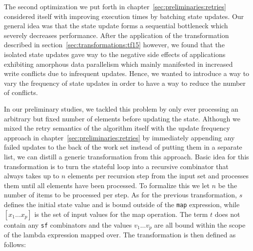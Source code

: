 The second optimization we put forth in chapter~\ref{sec:preliminaries:retries} considered itself with improving execution times by batching state updates.
Our general idea was that the state update forms a sequential bottleneck which severely decreases performance.
After the application of the transformation described in section~\ref{sec:transformations:tf15} however, we found that the isolated state updates gave way to the negative side effects of applications exhibiting amorphous data parallelism which mainly manifested in increased write conflicts due to infrequent updates.
Hence, we wanted to introduce a way to vary the frequency of state updates in order to have a way to reduce the number of conflicts.

In our preliminary studies, we tackled this problem by only ever processing an arbitrary but fixed number of elements before updating the state.
Although we mixed the retry semantics of the algorithm itself with the update frequency approach in chapter~\ref{sec:preliminaries:retries} by immediately appending any failed updates to the back of the work set instead of putting them in a separate list, we can distill a generic transformation from this approach.
Basic idea for this transformation is to turn the stateful loop into a recursive combinator that always takes up to $n$ elements per recursion step from the input set and processes them until all elements have been processed.
To formalize this we let $n$ be the number of items to be processed per step.
As for the previous transformation, $s$ defines the initial state value and is bound outside of the \texttt{map} expression, while $[x_1 \dots x_p]$ is the set of input values for the map operation.
The term $t$ does not contain any \texttt{sf} combinators and the values $v_1 \dots v_p$ are all bound within the scope of the lambda expression mapped over.
The transformation is then defined as follows:
